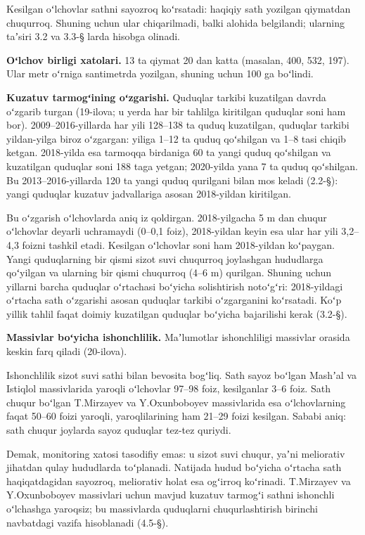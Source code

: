 Kesilgan oʻlchovlar sathni sayozroq koʻrsatadi: haqiqiy sath yozilgan
qiymatdan chuqurroq. Shuning uchun ular chiqarilmadi, balki alohida
belgilandi; ularning taʼsiri 3.2 va 3.3-§ larda hisobga olinadi.

\textbf{Oʻlchov birligi xatolari.} 13 ta qiymat 20 dan katta (masalan,
400, 532, 197). Ular metr oʻrniga santimetrda yozilgan, shuning uchun
100 ga boʻlindi.

\textbf{Kuzatuv tarmogʻining oʻzgarishi.} Quduqlar tarkibi kuzatilgan
davrda oʻzgarib turgan (19-ilova; u yerda har bir tahlilga kiritilgan
quduqlar soni ham bor). 2009--2016-yillarda har yili 128--138 ta quduq
kuzatilgan, quduqlar tarkibi yildan-yilga biroz oʻzgargan: yiliga 1--12
ta quduq qoʻshilgan va 1--8 tasi chiqib ketgan. 2018-yilda esa tarmoqqa
birdaniga 60 ta yangi quduq qoʻshilgan va kuzatilgan quduqlar soni 188
taga yetgan; 2020-yilda yana 7 ta quduq qoʻshilgan. Bu
2013--2016-yillarda 120 ta yangi quduq qurilgani bilan mos keladi
(2.2-§): yangi quduqlar kuzatuv jadvallariga asosan 2018-yildan
kiritilgan.

Bu oʻzgarish oʻlchovlarda aniq iz qoldirgan. 2018-yilgacha 5 m dan
chuqur oʻlchovlar deyarli uchramaydi (0--0,1 foiz), 2018-yildan keyin
esa ular har yili 3,2--4,3 foizni tashkil etadi. Kesilgan oʻlchovlar
soni ham 2018-yildan koʻpaygan. Yangi quduqlarning bir qismi sizot suvi
chuqurroq joylashgan hududlarga qoʻyilgan va ularning bir qismi
chuqurroq (4--6 m) qurilgan. Shuning uchun yillarni barcha quduqlar
oʻrtachasi boʻyicha solishtirish notoʻgʻri: 2018-yildagi oʻrtacha sath
oʻzgarishi asosan quduqlar tarkibi oʻzgarganini koʻrsatadi. Koʻp yillik
tahlil faqat doimiy kuzatilgan quduqlar boʻyicha bajarilishi kerak
(3.2-§).

\textbf{Massivlar boʻyicha ishonchlilik.} Maʼlumotlar ishonchliligi
massivlar orasida keskin farq qiladi (20-ilova).

Ishonchlilik sizot suvi sathi bilan bevosita bogʻliq. Sath sayoz boʻlgan
Mashʼal va Istiqlol massivlarida yaroqli oʻlchovlar 97--98 foiz,
kesilganlar 3--6 foiz. Sath chuqur boʻlgan T.Mirzayev va Y.Oxunboboyev
massivlarida esa oʻlchovlarning faqat 50--60 foizi yaroqli,
yaroqlilarining ham 21--29 foizi kesilgan. Sababi aniq: sath chuqur
joylarda sayoz quduqlar tez-tez quriydi.

Demak, monitoring xatosi tasodifiy emas: u sizot suvi chuqur, yaʼni
meliorativ jihatdan qulay hududlarda toʻplanadi. Natijada hudud boʻyicha
oʻrtacha sath haqiqatdagidan sayozroq, meliorativ holat esa ogʻirroq
koʻrinadi. T.Mirzayev va Y.Oxunboboyev massivlari uchun mavjud kuzatuv
tarmogʻi sathni ishonchli oʻlchashga yaroqsiz; bu massivlarda quduqlarni
chuqurlashtirish birinchi navbatdagi vazifa hisoblanadi (4.5-§).

